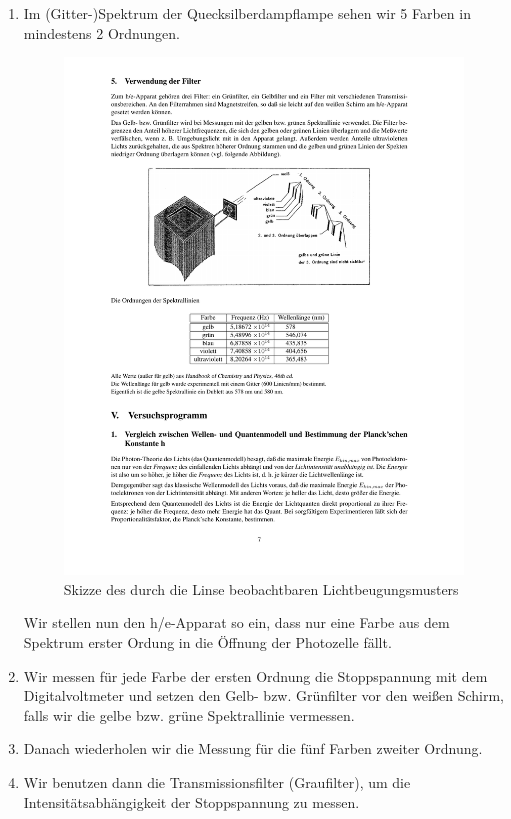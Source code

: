 \documentclass[12px]{scrartcl}
\begin{document}
\begin{enumerate}
\newpage
\item Im (Gitter-)Spektrum der Quecksilberdampflampe sehen wir 5 Farben in mindestens 2 Ordnungen.
\begin{figure}[htbp] 
  \centering
    \includegraphics[trim = 35mm 150mm 1mm 60mm, clip, scale = 1]{abb5.pdf}
  	\caption[Skizze des durch die Linse beobachtbaren Lichtbeugungsmusters]{Skizze des durch die Linse beobachtbaren Lichtbeugungsmusters\footnotemark}
  \label{fig:schaltskizze}
\end{figure}
	
Wir stellen nun den h/e-Apparat so ein, dass nur eine Farbe aus dem Spektrum erster Ordung in die Öffnung der Photozelle fällt.
\item Wir messen für jede Farbe der ersten Ordnung die Stoppspannung mit dem Digitalvoltmeter und setzen den
Gelb- bzw. Grünfilter vor den weißen Schirm, falls wir die gelbe bzw. grüne Spektrallinie vermessen.
\item Danach wiederholen wir die Messung für die fünf Farben zweiter Ordnung.
\item Wir benutzen dann die Transmissionsfilter (Graufilter), um die Intensitätsabhängigkeit der Stoppspannung zu messen.
\end{enumerate}
\end{document}
